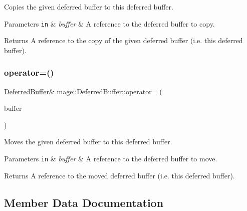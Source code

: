 Copies the given deferred buffer to this deferred buffer.


\begin{DoxyParams}[1]{Parameters}
\mbox{\tt in}  & {\em buffer} & A reference to the deferred buffer to copy. \\
\hline
\end{DoxyParams}
\begin{DoxyReturn}{Returns}
A reference to the copy of the given deferred buffer (i.\+e. this deferred buffer). 
\end{DoxyReturn}
\hypertarget{structmage_1_1_deferred_buffer_aaeebd1fa5bf16034b26c0416930859a3}{}\label{structmage_1_1_deferred_buffer_aaeebd1fa5bf16034b26c0416930859a3} 
\subsubsection{\texorpdfstring{operator=()}{operator=()}\hspace{0.1cm}{\footnotesize\ttfamily [2/2]}}
{\footnotesize\ttfamily \hyperlink{structmage_1_1_deferred_buffer}{Deferred\+Buffer}\& mage\+::\+Deferred\+Buffer\+::operator= (\begin{DoxyParamCaption}\item[{\hyperlink{structmage_1_1_deferred_buffer}{Deferred\+Buffer} \&\&}]{buffer }\end{DoxyParamCaption})\hspace{0.3cm}{\ttfamily [default]}}

Moves the given deferred buffer to this deferred buffer.


\begin{DoxyParams}[1]{Parameters}
\mbox{\tt in}  & {\em buffer} & A reference to the deferred buffer to move. \\
\hline
\end{DoxyParams}
\begin{DoxyReturn}{Returns}
A reference to the moved deferred buffer (i.\+e. this deferred buffer). 
\end{DoxyReturn}


\subsection{Member Data Documentation}
\hypertarget{structmage_1_1_deferred_buffer_a7dadbbdc33346d53bbfec7ebdbd06064}{}\label{structmage_1_1_deferred_buffer_a7dadbbdc33346d53bbfec7ebdbd06064} 
